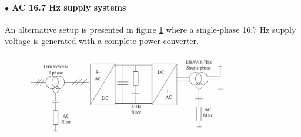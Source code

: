 \paragraph{$\bullet$ AC 16.7 Hz supply systems\\}
An alternative setup is presented in figure \ref{fig:abad2016e} where a single-phase 16.7 Hz supply voltage is generated with a complete power converter. 

\begin{figure}[h!]
	\centering
	\begin{minipage}{.7\textwidth}
		\centering
		\includegraphics[width=0.8\textwidth,keepaspectratio]{figures/31.PowerS/abad2016e}
		\label{fig:abad2016e}
	\end{minipage}
\end{figure}

